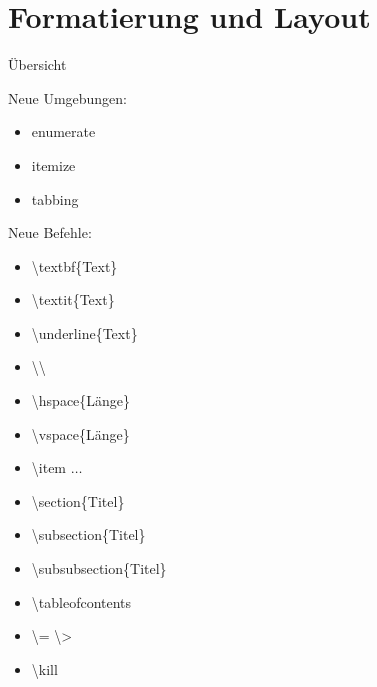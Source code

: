\section{Formatierung und Layout}
\begin{frame}{\"Ubersicht}
\begin{exampleblock}{Neue Umgebungen:}
\begin{multicols}{3}
\begin{itemize}
    \item \color{cpurple}enumerate
\end{itemize}\columnbreak
\begin{itemize}
    \item \color{cpurple}itemize
\end{itemize}\columnbreak
\begin{itemize}
    \item \color{cpurple}tabbing
\end{itemize}
\end{multicols}\color{black}
\end{exampleblock}
    \begin{block}{Neue Befehle:}
        \begin{multicols}{2}
        \begin{itemize}
            \item \color{cturkis}\textbackslash textbf\color{black}\{Text\}
            \item \color{cturkis}\textbackslash textit\color{black}\{Text\}
            \item \color{cturkis}\textbackslash underline\color{black}\{Text\}
            \item \color{cred}\textbackslash\textbackslash\color{black}
            \item\color{cturkis}\textbackslash hspace\color{black}\{\color{corange}L\"ange\color{black}\}
            \item\color{cturkis}\textbackslash vspace\color{black}\{\color{corange}L\"ange\color{black}\}
            \item \color{cred}\textbackslash item \color{black} $\hdots$
        \end{itemize}\columnbreak
        \begin{itemize}
            \item \color{cturkis}\textbackslash section\color{black}\{Titel\}
            \item \color{cturkis}\textbackslash subsection\color{black}\{Titel\}
            \item \color{cturkis}\textbackslash subsubsection\color{black}\{Titel\}
            \item \color{cturkis}\textbackslash tableofcontents
            \item \color{cred}\textbackslash= \textbackslash>
            \item \color{cred}\textbackslash kill
        \end{itemize}
        \end{multicols}
        
    \end{block}
\end{frame}
